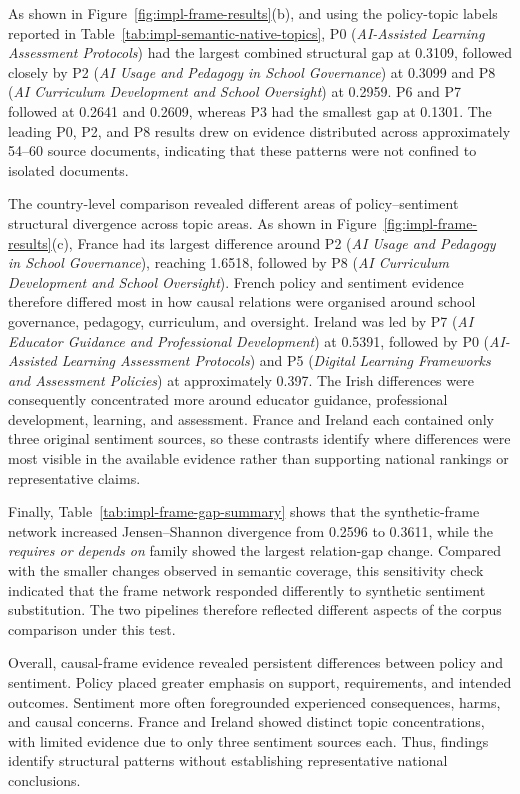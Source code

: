 As shown in Figure~\ref{fig:impl-frame-results}(b), and using the policy-topic labels
reported in Table~\ref{tab:impl-semantic-native-topics}, P0 (\textit{AI-Assisted
Learning Assessment Protocols}) had the largest combined structural gap at 0.3109,
followed closely by P2 (\textit{AI Usage and Pedagogy in School Governance}) at
0.3099 and P8 (\textit{AI Curriculum Development and School Oversight}) at 0.2959. P6
and P7 followed at 0.2641 and 0.2609, whereas P3 had the smallest gap at 0.1301. The
leading P0, P2, and P8 results drew on evidence distributed across approximately
54--60 source documents, indicating that these patterns were not confined to isolated
documents.

The country-level comparison revealed different areas of policy--sentiment structural
divergence across topic areas. As shown in Figure~\ref{fig:impl-frame-results}(c),
France had its largest difference around P2 (\textit{AI Usage and Pedagogy in School
Governance}), reaching 1.6518, followed by P8 (\textit{AI Curriculum Development and
School Oversight}). French policy and sentiment evidence therefore differed most in
how causal relations were organised around school governance, pedagogy, curriculum,
and oversight. Ireland was led by P7 (\textit{AI Educator Guidance and Professional
Development}) at 0.5391, followed by P0 (\textit{AI-Assisted Learning Assessment
Protocols}) and P5 (\textit{Digital Learning Frameworks and Assessment Policies}) at
approximately 0.397. The Irish differences were consequently concentrated more around
educator guidance, professional development, learning, and assessment. France and
Ireland each contained only three original sentiment sources, so these contrasts
identify where differences were most visible in the available evidence rather than
supporting national rankings or representative claims.

Finally, Table~\ref{tab:impl-frame-gap-summary} shows that the synthetic-frame
network increased Jensen--Shannon divergence from 0.2596 to 0.3611, while the
\textit{requires or depends on} family showed the largest relation-gap change.
Compared with the smaller changes observed in semantic coverage, this sensitivity
check indicated that the frame network responded differently to synthetic sentiment
substitution. The two pipelines therefore reflected different aspects of the corpus
comparison under this test.

Overall, causal-frame evidence revealed persistent differences between policy and
sentiment. Policy placed greater emphasis on support, requirements, and intended
outcomes. Sentiment more often foregrounded experienced consequences, harms, and
causal concerns. France and Ireland showed distinct topic concentrations, with limited evidence due to only three sentiment sources each.
 Thus, findings identify structural patterns without establishing
representative national conclusions.



